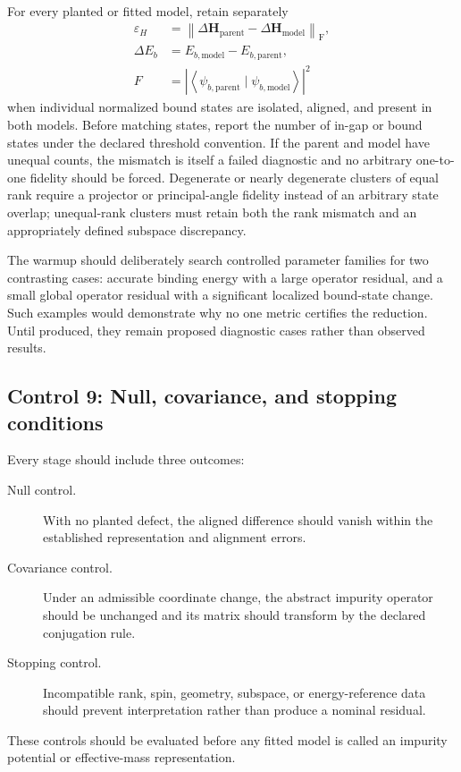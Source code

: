 For every planted or fitted model, retain separately
\begin{align}
    \varepsilon_H
    &=
    \left\lVert
        \Delta\mathbf H_{
        \mathrm{parent}}
        -
        \Delta\mathbf H_{
        \mathrm{model}}
    \right\rVert_{
    \mathrm F},
    \\
    \Delta E_b
    &=
    E_{b,\mathrm{model}}
    -
    E_{b,\mathrm{parent}},
    \\
    F
    &=
    \left|
        \left\langle
            \psi_{b,\mathrm{parent}}
            \mid
            \psi_{b,\mathrm{model}}
        \right\rangle
    \right|^2
\end{align}
when individual normalized bound states are isolated, aligned, and present in
both models. Before matching states, report the number of in-gap or bound states
under the declared threshold convention. If the parent and model have unequal
counts, the mismatch is itself a failed diagnostic and no arbitrary one-to-one
fidelity should be forced. Degenerate or nearly degenerate clusters of equal
rank require a projector or principal-angle fidelity instead of an arbitrary
state overlap; unequal-rank clusters must retain both the rank mismatch and an
appropriately defined subspace discrepancy.

The warmup should deliberately search controlled parameter families for two
contrasting cases: accurate binding energy with a large operator residual, and
a small global operator residual with a significant localized bound-state
change. Such examples would demonstrate why no one metric certifies the
reduction. Until produced, they remain proposed diagnostic cases rather than
observed results.

\subsection*{Control 9: Null, covariance, and stopping conditions}

Every stage should include three outcomes:
\begin{description}
    \item[Null control.] With no planted defect, the aligned difference should
      vanish within the established representation and alignment errors.
    \item[Covariance control.] Under an admissible coordinate change, the
      abstract impurity operator should be unchanged and its matrix should
      transform by the declared conjugation rule.
    \item[Stopping control.] Incompatible rank, spin, geometry, subspace, or
      energy-reference data should prevent interpretation rather than produce a
      nominal residual.
\end{description}
These controls should be evaluated before any fitted model is called an
impurity potential or effective-mass representation.


